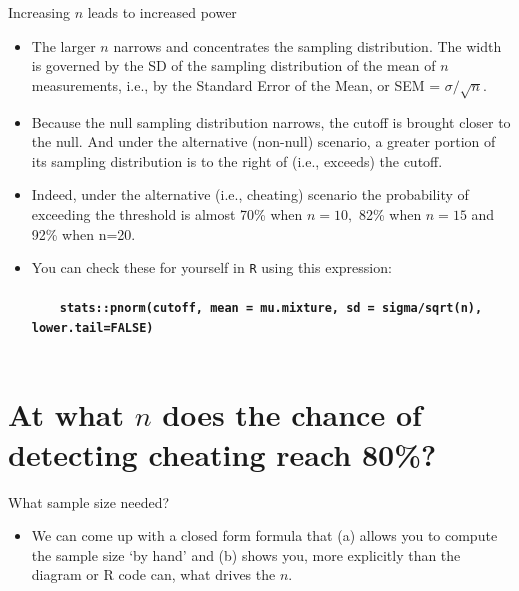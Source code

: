 \documentclass[10pt]{beamer}\usepackage[]{graphicx}\usepackage[]{color}
\begin{document}
\begin{frame}{Increasing $n$ leads to increased power}
	\begin{itemize}
		\item The larger $n$ narrows and concentrates the sampling distribution. The width is governed by the SD of the sampling distribution of the mean of $n$ measurements, i.e., by the Standard Error of the Mean, or SEM = $\sigma/\sqrt{n}$.\pause 
		
		\item Because the null sampling distribution narrows, the cutoff is brought closer to the null.
		And under the alternative (non-null) scenario, a greater portion of its sampling distribution is to
		the right of (i.e., exceeds) the cutoff. \pause 
		
		\item Indeed, under the alternative (i.e., cheating) scenario the probability of exceeding the threshold  is almost 70\% when $n=10,$ 82\% when $n=15$ and 92\% when n=20. \pause 
		\item 
		You can check these for yourself in \texttt{R} using this expression:\\ \ \\
		{ \footnotesize
			\ \ \ \ \texttt{\textbf{stats::pnorm(cutoff, mean = mu.mixture, sd = sigma/sqrt(n), lower.tail=FALSE)} }  \\ \ \\
		} 
	\end{itemize}
\end{frame}


\section{At what $n$ does the chance of detecting cheating reach 80\%?}

\begin{frame}{What sample size needed?}
	
	\begin{itemize}
		\item We can come up with a closed form formula that (a) allows you to compute the sample size `by hand' and (b) shows you, more explicitly than the diagram or R code can, what drives the $n$.
		
	\end{itemize}
	
\end{frame}
\end{document}
